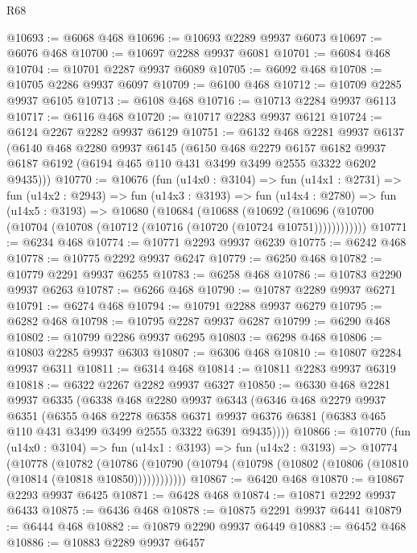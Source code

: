 \begin{lexlean}{R68}
\begin{coremodule}
@10693 := @6068 @468
@10696 := @10693 @2289 @9937 @6073
@10697 := @6076 @468
@10700 := @10697 @2288 @9937 @6081
@10701 := @6084 @468
@10704 := @10701 @2287 @9937 @6089
@10705 := @6092 @468
@10708 := @10705 @2286 @9937 @6097
@10709 := @6100 @468
@10712 := @10709 @2285 @9937 @6105
@10713 := @6108 @468
@10716 := @10713 @2284 @9937 @6113
@10717 := @6116 @468
@10720 := @10717 @2283 @9937 @6121
@10724 := @6124 @2267 @2282 @9937 @6129
@10751 := @6132
    @468
    @2281
    @9937
    @6137
    (@6140
      @468
      @2280
      @9937
      @6145
      (@6150
        @468
        @2279
        @6157
        @6182
        @9937
        @6187
        @6192
        (@6194 @465 @110 @431 @3499 @3499 @2555 @3322 @6202 @9435)))
@10770 := @10676
    (fun (u14x0 : @3104) =>
    fun (u14x1 : @2731) =>
    fun (u14x2 : @2943) =>
    fun (u14x3 : @3193) =>
    fun (u14x4 : @2780) =>
    fun (u14x5 : @3193) =>
    @10680
      (@10684
        (@10688
          (@10692 (@10696 (@10700 (@10704 (@10708 (@10712 (@10716 (@10720 (@10724 @10751))))))))))))
@10771 := @6234 @468
@10774 := @10771 @2293 @9937 @6239
@10775 := @6242 @468
@10778 := @10775 @2292 @9937 @6247
@10779 := @6250 @468
@10782 := @10779 @2291 @9937 @6255
@10783 := @6258 @468
@10786 := @10783 @2290 @9937 @6263
@10787 := @6266 @468
@10790 := @10787 @2289 @9937 @6271
@10791 := @6274 @468
@10794 := @10791 @2288 @9937 @6279
@10795 := @6282 @468
@10798 := @10795 @2287 @9937 @6287
@10799 := @6290 @468
@10802 := @10799 @2286 @9937 @6295
@10803 := @6298 @468
@10806 := @10803 @2285 @9937 @6303
@10807 := @6306 @468
@10810 := @10807 @2284 @9937 @6311
@10811 := @6314 @468
@10814 := @10811 @2283 @9937 @6319
@10818 := @6322 @2267 @2282 @9937 @6327
@10850 := @6330
    @468
    @2281
    @9937
    @6335
    (@6338
      @468
      @2280
      @9937
      @6343
      (@6346
        @468
        @2279
        @9937
        @6351
        (@6355
          @468
          @2278
          @6358
          @6371
          @9937
          @6376
          @6381
          (@6383 @465 @110 @431 @3499 @3499 @2555 @3322 @6391 @9435))))
@10866 := @10770
    (fun (u14x0 : @3104) =>
    fun (u14x1 : @3193) =>
    fun (u14x2 : @3193) =>
    @10774
      (@10778
        (@10782
          (@10786 (@10790 (@10794 (@10798 (@10802 (@10806 (@10810 (@10814 (@10818 @10850))))))))))))
@10867 := @6420 @468
@10870 := @10867 @2293 @9937 @6425
@10871 := @6428 @468
@10874 := @10871 @2292 @9937 @6433
@10875 := @6436 @468
@10878 := @10875 @2291 @9937 @6441
@10879 := @6444 @468
@10882 := @10879 @2290 @9937 @6449
@10883 := @6452 @468
@10886 := @10883 @2289 @9937 @6457

\end{coremodule}
\end{lexlean}
